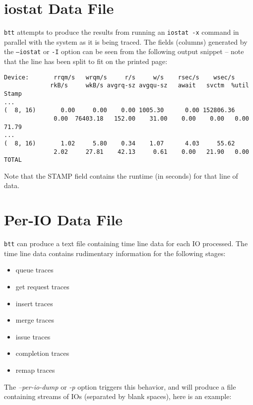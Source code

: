 \documentclass{article}
\begin{document}
\newpage\section{\label{sec:iostat}iostat Data File}
  \texttt{btt} attempts to produce the results from running an
  \texttt{iostat -x} command in parallel with the system as it is being
  traced. The fields (columns) generated by the \texttt{--iostat} or
  \texttt{-I} option can be seen from the following output snippet --
  note that the line has been split to fit on the printed page:

\begin{verbatim}
Device:       rrqm/s   wrqm/s     r/s     w/s    rsec/s    wsec/s
             rkB/s     wkB/s avgrq-sz avgqu-sz   await   svctm  %util   Stamp
...
(  8, 16)       0.00     0.00    0.00 1005.30      0.00 152806.36      
              0.00  76403.18   152.00    31.00    0.00    0.00   0.00   71.79
...
(  8, 16)       1.02     5.80    0.34    1.07      4.03     55.62
              2.02     27.81    42.13     0.61    0.00   21.90   0.00   TOTAL
\end{verbatim}

  Note that the STAMP field contains the runtime (in seconds) for that
  line of data.

\newpage\section{\label{sec:per-io}Per-IO Data File}

  \texttt{btt} can produce a text file containing time line data for each
  IO processed. The time line data contains rudimentary information for
  the following stages:

  \begin{itemize}
    \item queue traces
    \item get request traces
    \item insert traces
    \item merge traces
    \item issue traces
    \item completion traces
    \item remap traces
  \end{itemize}

  The \emph{--per-io-dump} or \emph{-p} option triggers this behavior,
  and will produce a file containing streams of IOs (separated by blank
  spaces), here is an example:
\end{document}

